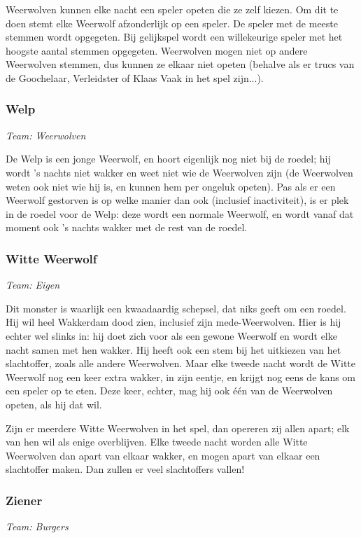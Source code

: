 \documentclass[12pt]{article}
\begin{document}
      Weerwolven kunnen elke nacht een speler opeten die ze zelf kiezen. Om dit te doen stemt elke Weerwolf afzonderlijk op een speler. De speler met de meeste stemmen wordt opgegeten. Bij gelijkspel wordt een willekeurige speler met het hoogste aantal stemmen opgegeten. Weerwolven mogen niet op andere Weerwolven stemmen, dus kunnen ze elkaar niet opeten (behalve als er trucs van de Goochelaar, Verleidster of Klaas Vaak in het spel zijn...).

    \subsubsection{Welp}
      \emph{\scriptsize Team: Weerwolven}
    
      De Welp is een jonge Weerwolf, en hoort eigenlijk nog niet bij de roedel; hij wordt 's nachts niet wakker en weet niet wie de Weerwolven zijn (de Weerwolven weten ook niet wie hij is, en kunnen hem per ongeluk opeten). Pas als er een Weerwolf gestorven is op welke manier dan ook (inclusief inactiviteit), is er plek in de roedel voor de Welp: deze wordt een normale Weerwolf, en wordt vanaf dat moment ook 's nachts wakker met de rest van de roedel.
    
    \subsubsection{Witte Weerwolf}
      \emph{\scriptsize Team: Eigen}
    
      Dit monster is waarlijk een kwaadaardig schepsel, dat niks geeft om een roedel. Hij wil heel Wakkerdam dood zien, inclusief zijn mede-Weerwolven. Hier is hij echter wel slinks in: hij doet zich voor als een gewone Weerwolf en wordt elke nacht samen met hen wakker. Hij heeft ook een stem bij het uitkiezen van het slachtoffer, zoals alle andere Weerwolven. Maar elke tweede nacht wordt de Witte Weerwolf nog een keer extra wakker, in zijn eentje, en krijgt nog eens de kans om een speler op te eten. Deze keer, echter, mag hij ook \'e\'en van de Weerwolven opeten, als hij dat wil.
    
      Zijn er meerdere Witte Weerwolven in het spel, dan opereren zij allen apart; elk van hen wil als enige overblijven. Elke tweede nacht worden alle Witte Weerwolven dan apart van elkaar wakker, en mogen apart van elkaar een slachtoffer maken. Dan zullen er veel slachtoffers vallen!
    
    \subsubsection{Ziener}
      \emph{\scriptsize Team: Burgers}
    
\end{document}
